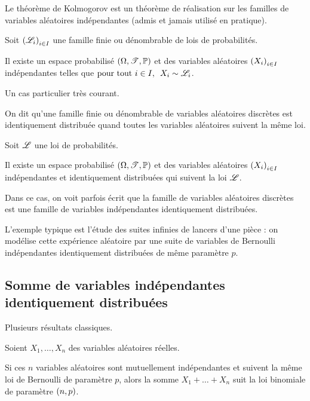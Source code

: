 Le théorème de Kolmogorov est un théorème de réalisation sur les familles de variables aléatoires indépendantes (admis et jamais utilisé en pratique).

\begin{theo}
Soit \(\left(\mathscr{L}_i\right)_{i\in I}\) une famille finie ou dénombrable de lois de probabilités.

Il existe un espace probabilisé \(\anneau{\Omega}[\fami{T}][\prem]\) et des variables aléatoires \(\left(X_i\right)_{i\in I}\) indépendantes telles que \(\quantifs{\tpt i\in I}X_i\sim\fami{L}_i\).
\end{theo}

Un cas particulier très courant.

\begin{defi}
On dit qu'une famille finie ou dénombrable de variables aléatoires discrètes est identiquement distribuée quand toutes les variables aléatoires suivent la même loi.
\end{defi}

\begin{theo}
Soit \(\mathscr{L}\) une loi de probabilités.

Il existe un espace probabilisé \(\anneau{\Omega}[\fami{T}][\prem]\) et des variables aléatoires \(\left(X_i\right)_{i\in I}\) indépendantes et identiquement distribuées qui suivent la loi \(\mathscr{L}\).
\end{theo}

Dans ce cas, on voit parfois écrit que la famille de variables aléatoires discrètes est une famille de variables indépendantes identiquement distribuées.

L'exemple typique est l'étude des suites infinies de lancers d'une pièce : on modélise cette expérience aléatoire par une suite de variables de Bernoulli indépendantes identiquement distribuées de même paramètre \(p\).

\subsection{Somme de variables indépendantes identiquement distribuées}

Plusieurs résultats classiques.

\begin{prop}
Soient \(X_1,\dots,X_n\) des variables aléatoires réelles.

Si ces \(n\) variables aléatoires sont mutuellement indépendantes et suivent la même loi de Bernoulli de paramètre \(p\), alors la somme \(X_1+\dots+X_n\) suit la loi binomiale de paramètre \(\left(n,p\right)\).
\end{prop}

